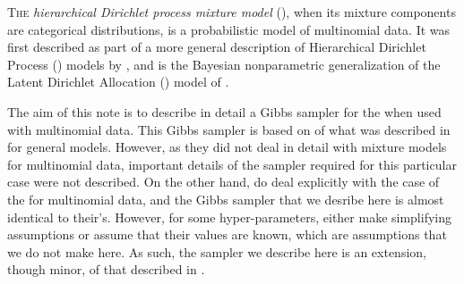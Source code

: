 \lettrine[lines=3,findent=1pt]%
{T}{he} \emph{hierarchical Dirichlet process mixture model} (\hdpmm), when its
mixture components are categorical distributions, is a probabilistic model of
multinomial data. It was first described as part of a more general description
of Hierarchical Dirichlet Process (\hdp) models by ,
and is the Bayesian nonparametric generalization of the Latent Dirichlet
Allocation (\lda) model of .  

The aim of this note is to describe in detail a Gibbs sampler for the
\hdpmm when used with multinomial data. This Gibbs sampler is based on of what
was described in  for general \hdp models. However,
as they did not deal in detail with \hdp mixture models for multinomial data,
important details of the sampler required for this particular case were not
described.  On the other hand,  do deal explicitly
with the case of the \hdpmm for multinomial data, and the Gibbs sampler that we
desribe here is almost identical to their's. However, for some
hyper-parameters,  either make simplifying
assumptions or assume that their values are known, which are assumptions that
we do not make here. As such, the sampler we describe here is an extension,
though minor, of that described in .
